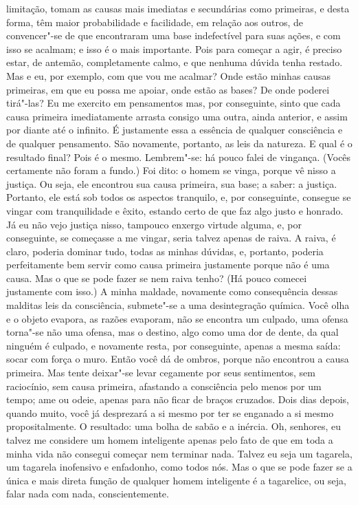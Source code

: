 limitação, tomam as causas mais imediatas e secundárias como primeiras,
e desta forma, têm maior probabilidade e facilidade, em relação aos
outros, de convencer"-se de que encontraram uma base indefectível para
suas ações, e com isso se acalmam; e isso é o mais importante. Pois
para começar a agir, é preciso estar, de antemão, completamente calmo,
e que nenhuma dúvida tenha restado. Mas e eu, por exemplo, com que vou
me acalmar? Onde estão minhas causas primeiras, em que eu possa me
apoiar, onde estão as bases? De onde poderei tirá"-las? Eu me exercito
em pensamentos mas, por conseguinte, sinto que cada causa primeira
imediatamente arrasta consigo uma outra, ainda anterior, e assim por
diante até o infinito. É justamente essa a essência de qualquer
consciência e de qualquer pensamento. São novamente, portanto, as leis
da natureza. E qual é o resultado final? Pois é o mesmo. Lembrem"-se: há
pouco falei de vingança. (Vocês certamente não foram a fundo.) Foi
dito: o homem se vinga, porque vê nisso a justiça. Ou seja, ele
encontrou sua causa primeira, sua base; a saber: a justiça. Portanto,
ele está sob todos os aspectos tranquilo, e, por conseguinte, consegue
se vingar com tranquilidade e êxito, estando certo de que faz algo
justo e honrado. Já eu não vejo justiça nisso, tampouco enxergo virtude
alguma, e, por conseguinte, se começasse a me vingar, seria talvez
apenas de raiva. A raiva, é claro, poderia dominar tudo, todas as
minhas dúvidas, e, portanto, poderia perfeitamente bem servir como
causa primeira justamente porque não é uma causa. Mas o que se pode
fazer se nem raiva tenho? (Há pouco comecei justamente com isso.) A
minha maldade, novamente como consequência dessas malditas leis da
consciência, submete"-se a uma desintegração química. Você olha e o
objeto evapora, as razões evaporam, não se encontra um culpado, uma
ofensa torna"-se não uma ofensa, mas o destino, algo como uma dor de
dente, da qual ninguém é culpado, e novamente resta, por conseguinte,
apenas a mesma saída: socar com força o muro. Então você dá de ombros,
porque não encontrou a causa primeira. Mas tente deixar"-se levar
cegamente por seus sentimentos, sem raciocínio, sem causa primeira,
afastando a consciência pelo menos por um tempo; ame ou odeie, apenas
para não ficar de braços cruzados. Dois dias depois, quando muito, você
já desprezará a si mesmo por ter se enganado a si mesmo
propositalmente. O resultado: uma bolha de sabão e a inércia. Oh,
senhores, eu talvez me considere um homem inteligente apenas pelo fato
de que em toda a minha vida não consegui começar nem terminar nada.
Talvez eu seja um tagarela, um tagarela inofensivo e enfadonho, como
todos nós. Mas o que se pode fazer se a única e mais direta função de
qualquer homem inteligente é a tagarelice, ou seja, falar nada com
nada, conscientemente.


